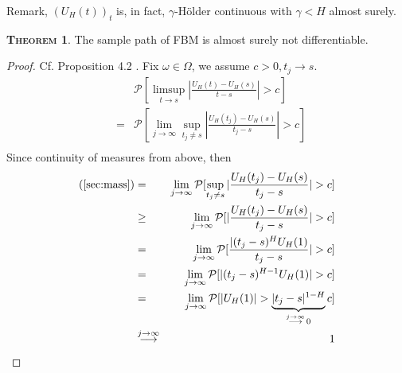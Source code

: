 \documentclass[a4paper, twoside, 11pt]{article}
\theoremstyle{definition}
\newtheorem{theorem}[definition]{\scshape Theorem}
\begin{document}
Remark, $(U_H(t))_t$ is, in fact, $\gamma$-H\"older continuous with $\gamma < H$ almost surely.

\begin{theorem}
  The sample path of FBM is almost surely not differentiable.
\end{theorem}

\begin{proof}
  Cf. \cite{mandelbrot} Proposition 4.2 . Fix $\omega \in \Omega$, we assume $c > 0, t_j \rightarrow s$.
\begin{eqnarray}
 && \mathcal{P}[\limsup\limits_{t\rightarrow s} |\frac{U_H(t) - U_H(s)}{t-s}| > c]\nonumber\\
 &=& \mathcal{P}[\lim\limits_{j\rightarrow\infty}\sup\limits_{t_j\neq s} |\frac{U_H(t_j) - U_H(s)}{t_j-s}| > c]\nonumber\\
 \label{sec:mass}
 \end{eqnarray}
 Since continuity of measures from above, then
 \begin{eqnarray*}
 \text{(\ref{sec:mass})} &=& \lim\limits_{j\rightarrow\infty} \mathcal{P}[\sup\limits_{t_j\neq s} |\frac{U_H(t_j) - U_H(s)}{t_j-s}| > c]\\
 &\ge& \lim\limits_{j\rightarrow\infty} \mathcal{P}[|\frac{U_H(t_j) - U_H(s)}{t_j-s}| > c]\\
 &=& \lim\limits_{j\rightarrow\infty} \mathcal{P}[\frac{|(t_j-s)^{H}U_H(1)}{t_j - s}| > c]\\
 &=& \lim\limits_{j\rightarrow\infty} \mathcal{P}[|(t_j-s)^{H-1}U_H(1)| > c]\\
 &=& \lim\limits_{j\rightarrow\infty} \mathcal{P}[|U_H(1)| > \underbrace{|t_j - s|^{1-H}}_{\overset{j\rightarrow\infty}{\longrightarrow}\, 0}c]\\
 &\overset{j\rightarrow \infty}{\longrightarrow}& 1 
\end{eqnarray*}
\end{proof}
\end{document}

